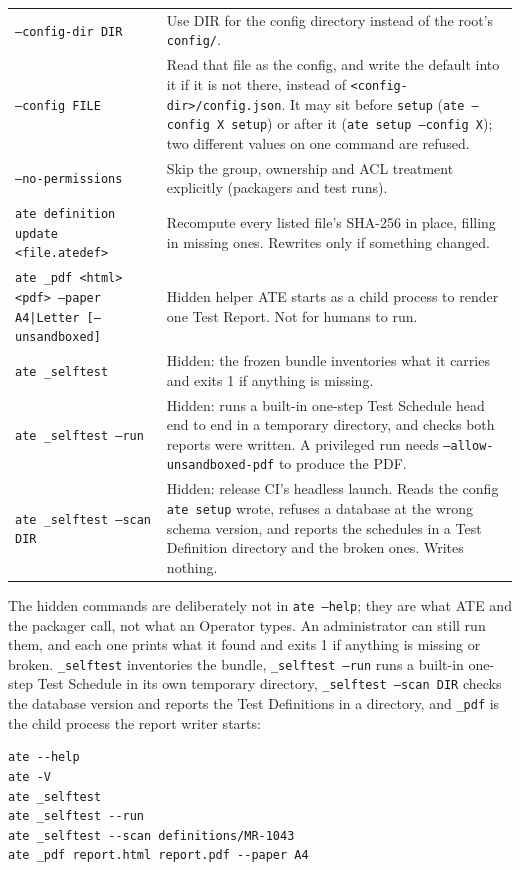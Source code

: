 \begin{longtable}{@{}>{\raggedright\arraybackslash}p{5.2cm}>{\raggedright\arraybackslash}p{9.6cm}@{}}
\texttt{--config-dir DIR} & Use DIR for the config directory instead of the root's \texttt{config/}. \\
\texttt{--config FILE} & Read that file as the config, and write the default into it if it is not
  there, instead of \texttt{<config-dir>/config.json}. It may sit before \texttt{setup}
  (\texttt{ate --config X setup}) or after it (\texttt{ate setup --config X}); two different values
  on one command are refused. \\
\texttt{--no-permissions} & Skip the group, ownership and ACL treatment explicitly (packagers and
  test runs). \\
\texttt{ate definition update <file.atedef>} & Recompute every listed file's SHA-256 in place,
  filling in missing ones. Rewrites only if something changed. \\
\texttt{ate \_pdf <html> <pdf> --paper A4|Letter [--unsandboxed]} & Hidden helper ATE starts as a
  child process to render one Test Report. Not for humans to run. \\
\texttt{ate \_selftest} & Hidden: the frozen bundle inventories what it carries and exits 1 if
  anything is missing. \\
\texttt{ate \_selftest --run} & Hidden: runs a built-in one-step Test Schedule head end to end in a
  temporary directory, and checks both reports were written. A privileged run needs
  \texttt{--allow-unsandboxed-pdf} to produce the PDF. \\
\texttt{ate \_selftest --scan DIR} & Hidden: release CI's headless launch. Reads the config
  \texttt{ate setup} wrote, refuses a database at the wrong schema version, and reports the schedules
  in a Test Definition directory and the broken ones. Writes nothing. \\
\bottomrule
\end{longtable}
\endgroup

The hidden commands are deliberately not in \texttt{ate --help}; they are what ATE and the packager
call, not what an Operator types. An administrator can still run them, and each one prints what it
found and exits 1 if anything is missing or broken. \texttt{\_selftest} inventories the bundle,
\texttt{\_selftest --run} runs a built-in one-step Test Schedule in its own temporary directory,
\texttt{\_selftest --scan DIR} checks the database version and reports the Test Definitions in a
directory, and \texttt{\_pdf} is the child process the report writer starts:

\begin{lstlisting}[language=ATEShell]
ate --help
ate -V
ate _selftest
ate _selftest --run
ate _selftest --scan definitions/MR-1043
ate _pdf report.html report.pdf --paper A4
\end{lstlisting}

